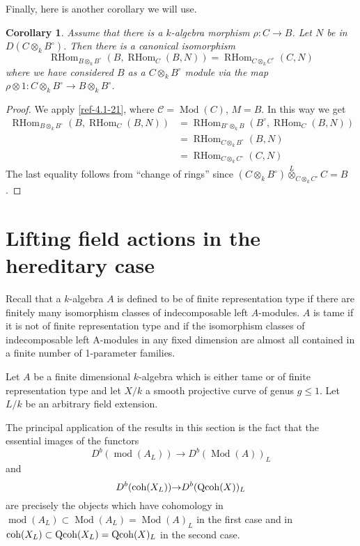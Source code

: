 \documentclass{amsart}
\numberwithin{equation}{section}
\let\cal\mathcal
\newtheorem{corollary}[lemma]{Corollary}
\theoremstyle{definition}
\theoremstyle{remark}
\begin{document}
Finally, here is another corollary we will use.  
\begin{corollary}
\label{ref-4.5-25}
Assume that there is a $k$-algebra morphism $\rho:C{\rightarrow} B$.
Let $N$ be in $D(C\otimes_k B^\circ)$. Then there is a canonical isomorphism
\[
{\operatorname {RHom}}_{B\otimes_k B^\circ}(B,{\operatorname {RHom}}_C(B,N))={\operatorname {RHom}}_{C\otimes_k C^\circ}(C,N)
\] 
where we have considered $B$ as a $C\otimes_k B^\circ$ module via 
the map $\rho\otimes 1:C\otimes_k B^\circ{\rightarrow} B\otimes_k B^\circ$.
\end{corollary}
\begin{proof}
We apply \eqref{ref-4.1-21}, where ${{\cal C}}={\operatorname{Mod}}(C)$, $M=B$.  In this way we get
\begin{align*}
{\operatorname {RHom}}_{B\otimes_k B^\circ}(B,{\operatorname {RHom}}_C(B,N))&={\operatorname {RHom}}_{B^\circ\otimes_k B}(B^\circ,{\operatorname {RHom}}_C(B,N))\\
&={\operatorname {RHom}}_{C\otimes_k B^\circ}(B,N)\\
&={\operatorname {RHom}}_{C\otimes_k C^\circ}(C,N)
\end{align*}
The last equality follows from ``change of rings'' since 
$
(C\otimes_k B^\circ){\overset{L}{\otimes}}_{C\otimes_k C^\circ} C=B
$.
\end{proof}

\section{Lifting field actions in the hereditary case}
\label{ref-5-26}
Recall that a $k$-algebra $A$ is defined to be of finite representation type if there are finitely many isomorphism classes of indecomposable left $A$-modules. $A$ is tame if it is not of finite representation type and if the isomorphism classes of indecomposable left A-modules in any fixed dimension are almost all contained in a finite number of 1-parameter families.

Let $A$ be a finite dimensional $k$-algebra which is either tame or of finite representation type and
let $X/k$ a smooth projective curve of genus $g\le 1$. Let $L/k$ be an arbitrary field extension.

The principal application of the results in this section is the fact that the essential images of the
functors
\[
D^b({\operatorname{mod}}(A_L)){\rightarrow} D^b({\operatorname{Mod}}(A))_L
\]
and
\[
D^b({\mathop{\text{\upshape{coh}}}}(X_L)){\rightarrow} D^b({\operatorname{Qcoh}}(X))_L
\]
are precisely the objects which have cohomology in ${\operatorname{mod}}(A_L)\subset {\operatorname{Mod}}(A_L)={\operatorname{Mod}}(A)_L$ in the first case
and in ${\mathop{\text{\upshape{coh}}}}(X_L)\subset {\operatorname{Qcoh}}(X_L)={\operatorname{Qcoh}}(X)_L$ in the second case.
\end{document}
